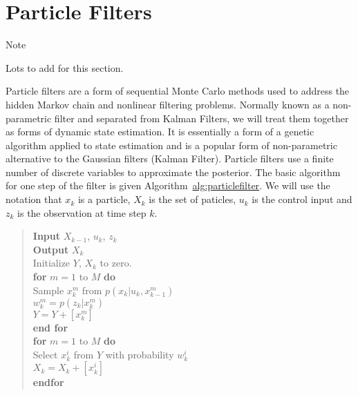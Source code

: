 \hypertarget{particle-filters}{%
\section{Particle Filters}\label{particle-filters}}

Note

Lots to add for this section.

Particle filters are a form of sequential Monte Carlo methods used to
address the hidden Markov chain and nonlinear filtering problems.
Normally known as a non-parametric filter and separated from Kalman
Filters, we will treat them together as forms of dynamic state
estimation. It is essentially a form of a genetic algorithm applied to
state estimation and is a popular form of non-parametric alternative to
the Gaussian filters (Kalman Filter). Particle filters use a finite
number of discrete variables to approximate the posterior. The basic
algorithm for one step of the filter is given
Algorithm~\href{..\%20topic::\%20\%20Particle\%20Filter.\%20:cite:\%60thrun2005probabilistic\%60}{alg:particlefilter}.
We will use the notation that \(x_k\) is a particle, \(X_k\) is the set
of paticles, \(u_k\) is the control input and \(z_k\) is the observation
at time step \(k\).

\begin{quote}
\textbf{Input} \(X_{k-1}\), \(u_k\), \(z_k\)\\
\textbf{Output} \(X_k\)\\
Initialize \(Y\), \(X_k\) to zero.\\
\textbf{for} \(m=1\) to \(M\) \textbf{do}\\
\hspace*{0.333em}\hspace*{0.333em}Sample \(x_k^m\) from
\(p(x_k | u_k, x_{k-1}^m)\)\\
\hspace*{0.333em}\hspace*{0.333em}\(w_k^m = p(z_k|x_k^m)\)\\
\hspace*{0.333em}\hspace*{0.333em}\(Y = Y + [x_k^m]\)\\
\textbf{end for}\\
\textbf{for} \(m=1\) to \(M\) \textbf{do}\\
\hspace*{0.333em}\hspace*{0.333em}Select \(x_k^i\) from \(Y\) with
probability \(w^i_k\)\\
\hspace*{0.333em}\hspace*{0.333em}\(X_k = X_k + [x_k^i]\)\\
\textbf{endfor}
\end{quote}

